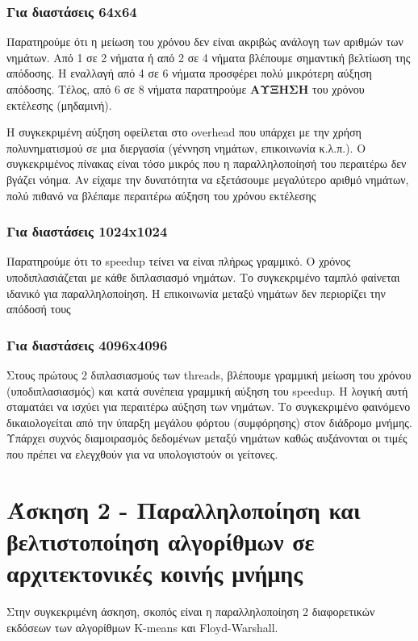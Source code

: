 \documentclass[letterpaper,12pt]{article}
\begin{document}
\subsubsection*{Για διαστάσεις 64x64}

Παρατηρούμε ότι η μείωση του χρόνου δεν είναι ακριβώς ανάλογη των αριθμών των νημάτων. Από 1 σε 2 νήματα ή από 2 σε 4 νήματα βλέπουμε σημαντική βελτίωση της απόδοσης. Η εναλλαγή από 4 σε 6 νήματα προσφέρει πολύ μικρότερη αύξηση απόδοσης. Τέλος, από 6 σε 8 νήματα παρατηρούμε \textbf{ΑΥΞΗΣΗ} του χρόνου εκτέλεσης (μηδαμινή). 

Η συγκεκριμένη αύξηση οφείλεται στο overhead που υπάρχει με την χρήση πολυνηματισμού σε μια διεργασία (γέννηση νημάτων, επικοινωνία κ.λ.π.). Ο συγκεκριμένος πίνακας είναι τόσο μικρός που η παραλληλοποίησή του περαιτέρω δεν βγάζει νόημα. Αν είχαμε την δυνατότητα να εξετάσουμε μεγαλύτερο αριθμό νημάτων, πολύ πιθανό να βλέπαμε περαιτέρω αύξηση του χρόνου εκτέλεσης
\subsubsection*{Για διαστάσεις 1024x1024}

Παρατηρούμε ότι το speedup τείνει να είναι πλήρως γραμμικό. Ο χρόνος υποδιπλασιάζεται με κάθε διπλασιασμό νημάτων. Το συγκεκριμένο ταμπλό φαίνεται ιδανικό για παραλληλοποίηση. Η επικοινωνία μεταξύ νημάτων δεν περιορίζει την απόδοσή τους
\subsubsection*{Για διαστάσεις 4096x4096}

Στους πρώτους 2 διπλασιασμούς των threads, βλέπουμε γραμμική μείωση του χρόνου (υποδιπλασιασμός) και κατά συνέπεια γραμμική αύξηση του speedup. Η λογική αυτή σταματάει να ισχύει για περαιτέρω αύξηση των νημάτων. Το συγκεκριμένο φαινόμενο δικαιολογείται από την ύπαρξη μεγάλου φόρτου (συμφόρησης) στον διάδρομο μνήμης. Υπάρχει συχνός διαμοιρασμός δεδομένων μεταξύ νημάτων καθώς αυξάνονται οι τιμές που πρέπει να ελεγχθούν για να υπολογιστούν οι γείτονες.


\section{Άσκηση 2 - Παραλληλοποίηση και βελτιστοποίηση αλγορίθμων σε αρχιτεκτονικές κοινής μνήμης}

Στην συγκεκριμένη άσκηση, σκοπός είναι η παραλληλοποίηση 2 διαφορετικών εκδόσεων των αλγορίθμων K-means και Floyd-Warshall.
\end{document}
